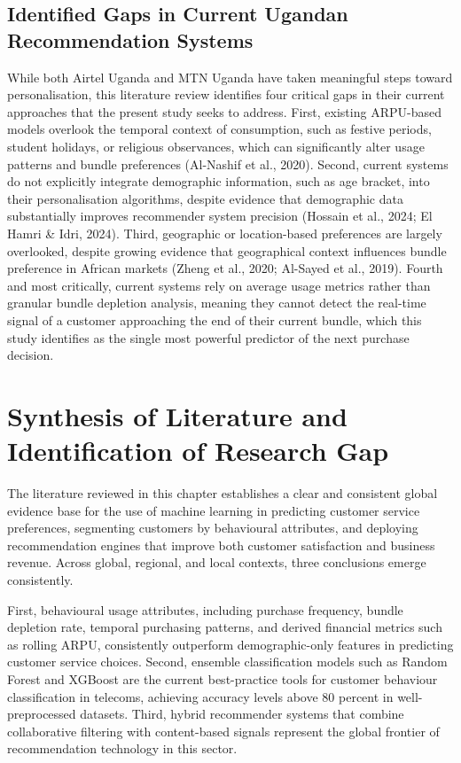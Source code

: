 \subsection{Identified Gaps in Current Ugandan Recommendation Systems}

While both Airtel Uganda and MTN Uganda have taken meaningful steps toward personalisation, this literature review identifies four critical gaps in their current approaches that the present study seeks to address. First, existing ARPU-based models overlook the temporal context of consumption, such as festive periods, student holidays, or religious observances, which can significantly alter usage patterns and bundle preferences (Al-Nashif et al., 2020). Second, current systems do not explicitly integrate demographic information, such as age bracket, into their personalisation algorithms, despite evidence that demographic data substantially improves recommender system precision (Hossain et al., 2024; El Hamri \& Idri, 2024). Third, geographic or location-based preferences are largely overlooked, despite growing evidence that geographical context influences bundle preference in African markets (Zheng et al., 2020; Al-Sayed et al., 2019). Fourth and most critically, current systems rely on average usage metrics rather than granular bundle depletion analysis, meaning they cannot detect the real-time signal of a customer approaching the end of their current bundle, which this study identifies as the single most powerful predictor of the next purchase decision.


\section{Synthesis of Literature and Identification of Research Gap}

The literature reviewed in this chapter establishes a clear and consistent global evidence base for the use of machine learning in predicting customer service preferences, segmenting customers by behavioural attributes, and deploying recommendation engines that improve both customer satisfaction and business revenue. Across global, regional, and local contexts, three conclusions emerge consistently.

First, behavioural usage attributes, including purchase frequency, bundle depletion rate, temporal purchasing patterns, and derived financial metrics such as rolling ARPU, consistently outperform demographic-only features in predicting customer service choices. Second, ensemble classification models such as Random Forest and XGBoost are the current best-practice tools for customer behaviour classification in telecoms, achieving accuracy levels above 80 percent in well-preprocessed datasets. Third, hybrid recommender systems that combine collaborative filtering with content-based signals represent the global frontier of recommendation technology in this sector.


